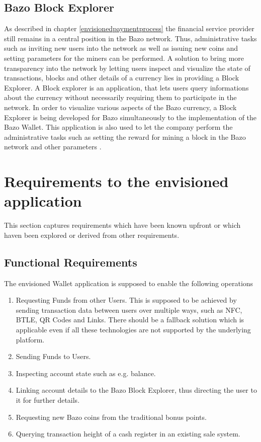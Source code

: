 \subsection{Bazo Block Explorer\label{bazoblockexplorer}}
As described in chapter \ref{envisionedpaymentprocess} the financial service provider still remains in a central position in the Bazo network. Thus, administrative tasks such as inviting new users into the network as well as issuing new coins and setting
parameters for the miners can be performed.
A solution to bring more transparency into the network by letting users inspect and visualize the state of transactions, blocks and other details of a currency lies in providing a Block Explorer. A Block explorer is an application, that lets users query informations about the currency without necessarily requiring them to participate in the network.
In order to visualize various aspects of the Bazo currency, a Block Explorer is being developed for Bazo simultaneously to the implementation of the Bazo Wallet. This application is also used to let the company perform the administrative tasks such as setting the reward for mining a block in the Bazo network and other parameters \cite{bazoblockexplorer}.

\section{Requirements to the envisioned application}\label{requirements}
This section captures requirements which have been known upfront or which haven been explored or derived from other requirements. 
\subsection{Functional Requirements}\label{functionalreq}
The envisioned Wallet application is supposed to enable the following operations
\begin{enumerate}
\item Requesting Funds from other Users.
This is supposed to be achieved by sending transaction data between users over multiple ways, such as NFC, BTLE, QR Codes and Links. There should be a fallback solution which is applicable even if all these technologies are not supported by the underlying platform.
\item Sending Funds to Users.
\item Inspecting account state such as e.g. balance.
\item Linking account details to the Bazo Block Explorer, thus directing the user to it for further details.
\item Requesting new Bazo coins from the traditional bonus points.
\item Querying transaction height of a cash register in an existing sale system.


\end{enumerate}
